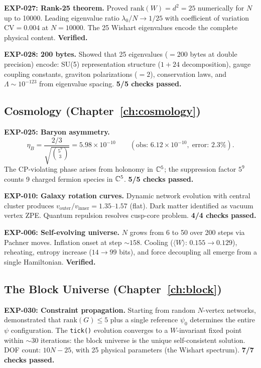 \textbf{EXP-027: Rank-25 theorem.} Proved $\text{rank}(W) = d^2 = 25$ numerically for $N$ up to 10000. Leading eigenvalue ratio $\lambda_0/N \to 1/25$ with coefficient of variation $\text{CV} = 0.004$ at $N = 10000$. The 25 Wishart eigenvalues encode the complete physical content. \textbf{Verified.}

\textbf{EXP-028: 200 bytes.} Showed that 25 eigenvalues ($= 200$ bytes at double precision) encode: SU(5) representation structure ($1 + 24$ decomposition), gauge coupling constants, graviton polarizations ($= 2$), conservation laws, and $\Lambda \sim 10^{-123}$ from eigenvalue spacing. \textbf{5/5 checks passed.}

\subsection{Cosmology (Chapter~\ref{ch:cosmology})}

\textbf{EXP-025: Baryon asymmetry.}
\begin{equation}
\eta_B = \frac{2/3}{\sqrt{\binom{5^9}{3}}} = 5.98 \times 10^{-10} \qquad (\text{obs: } 6.12 \times 10^{-10},\;\text{error: } 2.3\%).
\end{equation}
The CP-violating phase arises from holonomy in $\mathbb{C}^5$; the suppression factor $5^9$ counts 9 charged fermion species in $\mathbb{C}^5$. \textbf{5/5 checks passed.}

\textbf{EXP-010: Galaxy rotation curves.} Dynamic network evolution with central cluster produces $v_\text{outer}/v_\text{inner} = 1.35$--$1.57$ (flat). Dark matter identified as vacuum vertex ZPE. Quantum repulsion resolves cusp-core problem. \textbf{4/4 checks passed.}

\textbf{EXP-006: Self-evolving universe.} $N$ grows from 6 to 50 over 200 steps via Pachner moves. Inflation onset at step $\sim 158$. Cooling ($\langle W\rangle$: $0.155 \to 0.129$), reheating, entropy increase ($14 \to 99$ bits), and force decoupling all emerge from a single Hamiltonian. \textbf{Verified.}

\subsection{The Block Universe (Chapter~\ref{ch:block})}

\textbf{EXP-030: Constraint propagation.} Starting from random $N$-vertex networks, demonstrated that $\text{rank}(G) \leq 5$ plus a single reference $\psi_0$ determines the entire $\psi$ configuration. The \texttt{tick()} evolution converges to a $W$-invariant fixed point within $\sim 30$ iterations: the block universe is the unique self-consistent solution. DOF count: $10N - 25$, with 25 physical parameters (the Wishart spectrum). \textbf{7/7 checks passed.}

